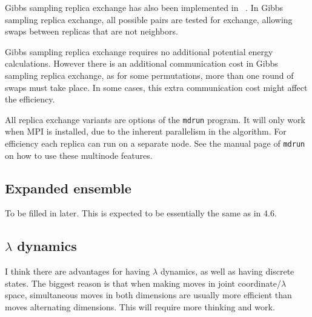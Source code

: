 \documentclass[11pt,a4paper,twoside]{article}
\begin{document}
Gibbs sampling replica exchange has also been implemented in
{\gromacs}~\cite{Chodera2011}.  In Gibbs sampling replica exchange, all
possible pairs are tested for exchange, allowing swaps between
replicas that are not neighbors.

Gibbs sampling replica exchange requires no additional potential
energy calculations.  However there is an additional communication
cost in Gibbs sampling replica exchange, as for some permutations,
more than one round of swaps must take place.  In some cases, this
extra communication cost might affect the efficiency.

All replica exchange variants are options of the {\tt mdrun}
program. It will only work when MPI is installed, due to the inherent
parallelism in the algorithm. For efficiency each replica can run on a
separate node.  See the manual page of {\tt mdrun} on how to use these
multinode features.

\subsection{Expanded ensemble}

To be filled in later.  This is expected to be essentially the same as in 4.6.

\subsection{$\lambda$ dynamics}

I think there are advantages for having $\lambda$ dynamics, as well as
having discrete states.  The biggest reason is that when making moves
in joint coordinate/$\lambda$ space, simultaneous moves in both
dimensions are usually more efficient than moves alternating
dimensions.  This will require more thinking and work.



\end{document}
